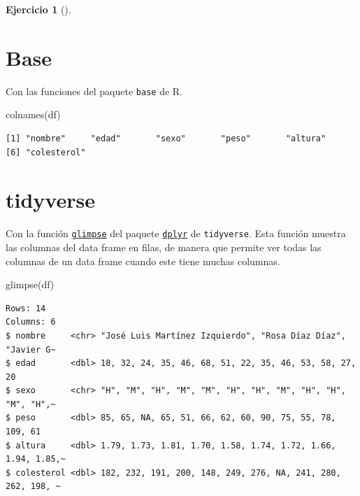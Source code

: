 \documentclass[
  a4paper,
]{scrreport}
\newenvironment{Shaded}{\begin{snugshade}}{\end{snugshade}}
\newcommand{\FunctionTok}[1]{\textcolor[rgb]{0.28,0.35,0.67}{#1}}
\newcommand{\NormalTok}[1]{\textcolor[rgb]{0.00,0.23,0.31}{#1}}
\theoremstyle{definition}
\newtheorem{exercise}{Ejercicio}[chapter]
\theoremstyle{remark}
\begin{document}
\begin{exercise}[]
\begin{enumerate}
  \begin{tcolorbox}[enhanced jigsaw, breakable, toptitle=1mm, colbacktitle=quarto-callout-tip-color!10!white, rightrule=.15mm, opacityback=0, opacitybacktitle=0.6, titlerule=0mm, coltitle=black, colframe=quarto-callout-tip-color-frame, colback=white, bottomtitle=1mm, leftrule=.75mm, toprule=.15mm, title=\textcolor{quarto-callout-tip-color}{\faLightbulb}\hspace{0.5em}{Solución}, arc=.35mm, bottomrule=.15mm, left=2mm]

  \section{Base}

  Con las funciones del paquete \texttt{base} de R.

\begin{Shaded}
\begin{Highlighting}[]
\FunctionTok{colnames}\NormalTok{(df)}
\end{Highlighting}
\end{Shaded}

\begin{verbatim}
[1] "nombre"     "edad"       "sexo"       "peso"       "altura"    
[6] "colesterol"
\end{verbatim}

  \section{tidyverse}

  Con la función
  \href{https://dplyr.tidyverse.org/reference/glimpse.html?q=read_csv\#undefined}{\texttt{glimpse}}
  del paquete
  \href{https://dplyr.tidyverse.org/index.html}{\texttt{dplyr}} de
  \texttt{tidyverse}. Esta función muestra las columnas del data frame
  en filas, de manera que permite ver todas las columnas de un data
  frame cuando este tiene muchas columnas.

\begin{Shaded}
\begin{Highlighting}[]
\FunctionTok{glimpse}\NormalTok{(df)}
\end{Highlighting}
\end{Shaded}

\begin{verbatim}
Rows: 14
Columns: 6
$ nombre     <chr> "José Luis Martínez Izquierdo", "Rosa Díaz Díaz", "Javier G~
$ edad       <dbl> 18, 32, 24, 35, 46, 68, 51, 22, 35, 46, 53, 58, 27, 20
$ sexo       <chr> "H", "M", "H", "M", "M", "H", "H", "M", "H", "H", "M", "H",~
$ peso       <dbl> 85, 65, NA, 65, 51, 66, 62, 60, 90, 75, 55, 78, 109, 61
$ altura     <dbl> 1.79, 1.73, 1.81, 1.70, 1.58, 1.74, 1.72, 1.66, 1.94, 1.85,~
$ colesterol <dbl> 182, 232, 191, 200, 148, 249, 276, NA, 241, 280, 262, 198, ~
\end{verbatim}


\end{tcolorbox}
\end{enumerate}
\end{exercise}
\end{document}
